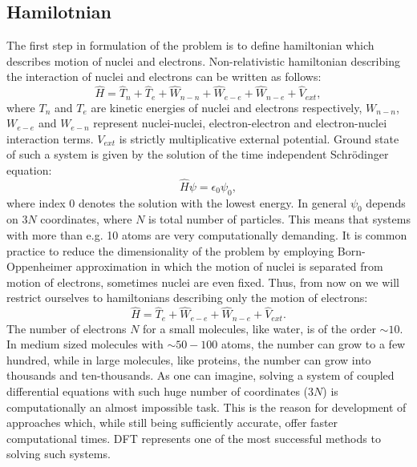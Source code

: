 \documentclass[openany, longbibliography,slovene,a4paper,12pt]{article}
\begin{document}
\subsection{Hamilotnian}
The first step in formulation of the problem is to define hamiltonian which
describes motion of nuclei and electrons. Non-relativistic hamiltonian
describing the interaction of  nuclei and electrons can be written as follows:
\begin{equation} \label{full_hamiltonian}
\hat H= \hat T_n + \hat  T_e + \hat  W_{n-n} + \hat W_{e-e} + \hat W_{n-e} + \hat V_{ext},
\end{equation}
where $T_n$ and $T_e$ are kinetic energies of nuclei and electrons respectively,
$W_{n-n}$, $W_{e-e}$ and $W_{e-n}$ represent  nuclei-nuclei, electron-electron
and electron-nuclei interaction terms. $V_{ext}$ is strictly multiplicative
external potential. Ground state of such a system is given by the solution of
the time independent Schr{\"o}dinger equation:
\begin{equation} \label{ham_solution}
\hat H \psi = \epsilon_0 \psi_0,
\end{equation} 
where index $0$ denotes the solution with the lowest energy. In general $\psi_0$
depends on $3N$ coordinates, where $N$ is total number of particles. This means
that systems with more than e.g. 10 atoms are very computationally
demanding. It is common practice to reduce the dimensionality of the problem by employing
Born-Oppenheimer approximation in which the motion of nuclei is separated from
motion of electrons, sometimes nuclei are even fixed. Thus, from now on we will
restrict ourselves to hamiltonians describing only the motion of electrons:
\begin{equation} \label{electron_hamiltonian}
\hat H=  \hat  T_e  + \hat W_{e-e} + \hat W_{n-e} + \hat V_{ext}.
\end{equation}
The number of electrons $N$ for a small molecules, like water, is of the order
$\sim 10$. In medium sized molecules with $\sim 50-100$ atoms, the number can
grow to a few hundred, while in large molecules, like proteins, the number can
grow into thousands and ten-thousands. As one can imagine, solving a system of
coupled differential equations with such huge number of coordinates ($3N$) is
computationally an almost impossible task.
This is the reason for development of approaches which, while still being
sufficiently accurate, offer faster computational times. DFT represents one of
the most successful methods to solving such systems.
\end{document}
